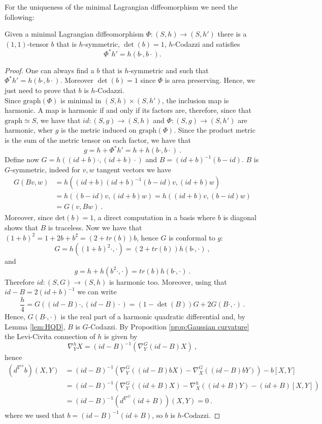 For the uniqueness of the minimal Lagrangian diffeomorphism we need the following:
\begin{lemma} \label{lem:Lagrangian shit}
    Given a minimal Lagrangian diffeomorphism $\Phi : (S,h) \to (S,h')$ there is a $(1,1)$-tensor $b$ that is $h$-symmetric, $\det(b)=1$, $h$-Codazzi and satisfies
    \[
        \Phi^* h' = h(b \cdot, b \cdot) .
    \]
\end{lemma}
\begin{proof}
    One can always find a $b$ that is $h$-symmetric and such that $\Phi^* h' = h(b \cdot, b \cdot)$. Moreover $\det(b)=1$ since $\Phi$ is area preserving. Hence, we just need to prove that $b$ is $h$-Codazzi.\\
    Since $\text{graph}(\Phi)$ is minimal in $(S,h) \times (S,h')$, the inclusion map is harmonic. A map is harmonic if and only if its factors are, therefore, since that $\text{graph} \simeq S$, we have that $id:(S,g) \to (S,h)$ and $\Phi:(S,g)\to (S,h')$ are harmonic, wher $g$ is the metric induced on $\text{graph}(\Phi)$.
    Since the product metric is the sum of the metric tensor on each factor, we have that
    \[
        g = h + \Phi^* h' = h + h(b \cdot, b \cdot) \ .
    \]
    Define now $G = h((id+b)\cdot ,(id+b)\cdot )$ and $B = (id+b)^{-1}(b-id)$.
    $B$ is $G$-symmetric, indeed for $v,w$ tangent vectors we have
    \[
    \begin{split}
        G(B v,w) & = h((id + b) (id + b)^{-1} (b-id) v , (id + b)w) \\
        & = h((b-id) v , (id + b)w) = h((id + b) v , (b-id)w) \\
        & = G(v, B w) \ .
    \end{split}
    \]
    Moreover, since $\text{det}(b)=1$, a direct computation in a basis where $b$ is diagonal shows that $B$ is traceless. 
    Now we have that $(1+b)^2=1+2b+b^2 = (2 + tr(b))b$, hence $G$ is conformal to $g$:
    \[
        G= h((1+b)^2 \cdot, \cdot) = (2+tr(b))h(b \cdot , \cdot) \ ,
    \]
    and
    \[
        g= h + h(b^2 \cdot,\cdot) = tr(b)h(b\cdot, \cdot) \ .
    \]
    Therefore $id: (S,G)\to (S,h)$ is harmonic too.
    Moreover, using that $id-B = 2(id+b)^{-1}$ we can write
    \[
        \frac{h}{4} = G((id-B) \cdot, (id-B) \cdot) = (1-\det(B))G + 2G(B \cdot , \cdot) \ .
    \]
    Hence, $G(B\cdot, \cdot)$ is the real part of a harmonic quadratic differential and, by Lemma \ref{lem:HQD}, $B$ is $G$-Codazzi. By Proposition \ref{prop:Gaussian curvature} the Levi-Civita connection of $h$ is given by
    \[
        \nabla^h_Y X= (id-B)^{-1} (\nabla^G_Y (id-B)X) \ ,
    \]
    hence
    \[
    \begin{split}
        (d^{\nabla^h} b)(X,Y) & = (id - B)^{-1} (\nabla^G_Y ((id-B) b X) - \nabla^G_X ((id-B) b Y) ) - b \left[ X,Y \right] \\
        & = (id -B)^{-1} (\nabla^G_Y ((id+B) X) -  \nabla^h_X ((id+B) Y) - (id+B) \left[ X,Y \right] ) \\
        & = (id - B)^{-1}(d^{\nabla^G}(id+B))(X,Y) = 0 \ .
    \end{split}
    \]
    where we used that $b = (id - B)^{-1}(id + B)$, so $b$ is $h$-Codazzi.
\end{proof}

